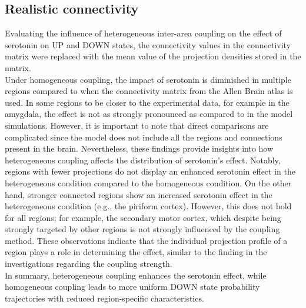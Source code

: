 \subsection{Realistic connectivity}
\noindent
\indent Evaluating the influence of heterogeneous inter-area coupling on the effect of serotonin on UP and DOWN states, the connectivity values in the connectivity matrix were replaced with the mean value of the projection densities stored in the matrix. 
\\
\indent Under homogeneous coupling, the impact of serotonin is diminished in multiple regions compared to when the connectivity matrix from the Allen Brain atlas is used. In some regions to be closer to the experimental data, for example in the amygdala, the effect is not as strongly pronounced as compared to in the model simulations. However, it is important to note that direct comparisons are complicated since the model does not include all the regions and connections present in the brain. Nevertheless, these findings provide insights into how heterogeneous coupling affects the distribution of serotonin’s effect. Notably, regions with fewer projections do not display an enhanced serotonin effect in the heterogeneous condition compared to the homogeneous condition. On the other hand, stronger connected regions show an increased serotonin effect in the heterogeneous condition (e.g., the piriform cortex). However, this does not hold for all regions; for example, the secondary motor cortex, which despite being strongly targeted by other regions is not strongly influenced by the coupling method. These observations indicate that the individual projection profile of a region plays a role in determining the effect, similar to the finding in the investigations regarding the coupling strength. 
\\
\indent In summary, heterogeneous coupling enhances the serotonin effect, while homogeneous coupling leads to more uniform DOWN state probability trajectories with reduced region-specific characteristics.



